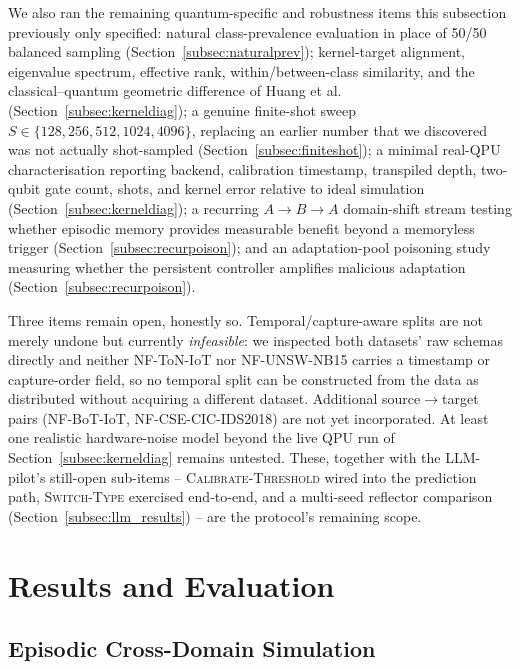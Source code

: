 \documentclass[conference]{IEEEtran}
\begin{document}
We also ran the remaining quantum-specific and robustness items this
subsection previously only specified: natural class-prevalence evaluation
in place of 50/50 balanced sampling (Section~\ref{subsec:naturalprev});
kernel-target alignment, eigenvalue spectrum, effective rank,
within/between-class similarity, and the classical--quantum geometric
difference of Huang et al.\ \cite{huang2021}
(Section~\ref{subsec:kerneldiag}); a genuine finite-shot sweep
$S \in \{128, 256, 512, 1024, 4096\}$, replacing an earlier number
that we discovered was not actually shot-sampled
(Section~\ref{subsec:finiteshot}); a minimal real-QPU characterisation
reporting backend, calibration timestamp, transpiled depth, two-qubit
gate count, shots, and kernel error relative to ideal simulation
(Section~\ref{subsec:kerneldiag}); a recurring $A\to B\to A$ domain-shift
stream testing whether episodic memory provides measurable benefit beyond
a memoryless trigger (Section~\ref{subsec:recurpoison}); and an
adaptation-pool poisoning study measuring whether the persistent
controller amplifies malicious adaptation (Section~\ref{subsec:recurpoison}).

Three items remain open, honestly so. Temporal/capture-aware splits are
not merely undone but currently \emph{infeasible}: we inspected both
datasets' raw schemas directly and neither NF-ToN-IoT nor NF-UNSW-NB15
carries a timestamp or capture-order field, so no temporal split can be
constructed from the data as distributed without acquiring a different
dataset. Additional source$\to$target pairs (NF-BoT-IoT,
NF-CSE-CIC-IDS2018) are not yet incorporated. At least one realistic
hardware-noise model beyond the live QPU run of
Section~\ref{subsec:kerneldiag} remains untested. These, together with
the LLM-pilot's still-open sub-items -- \textsc{Calibrate-Threshold}
wired into the prediction path, \textsc{Switch-Type} exercised
end-to-end, and a multi-seed reflector comparison
(Section~\ref{subsec:llm_results}) -- are the protocol's remaining
scope.

\section{Results and Evaluation}
\label{sec:results}

\subsection{Episodic Cross-Domain Simulation}
\label{subsec:episode_results}
\end{document}
